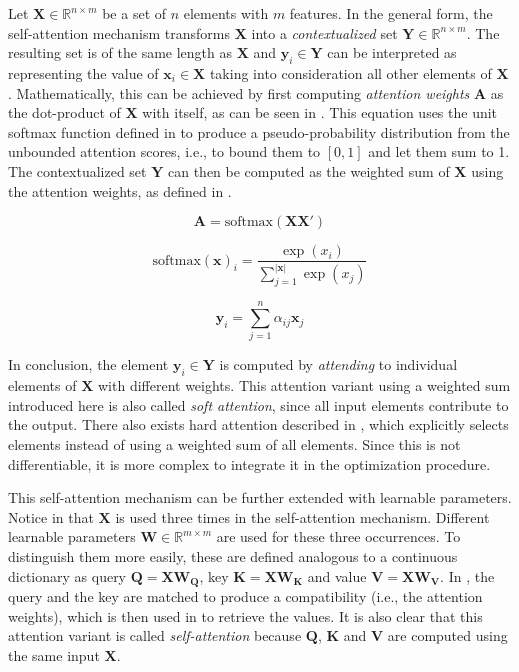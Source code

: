 Let $\mathbf{X} \in \mathbb{R}^{n\times m}$ be a set of $n$ elements with $m$ features. In the general form, the self-attention mechanism transforms $\mathbf{X}$ into a \emph{contextualized} set $\mathbf{Y} \in \mathbb{R}^{n \times m}$. The resulting set is of the same length as $\mathbf{X}$ and $\mathbf{y}_i \in \mathbf{Y}$ can be interpreted as representing the value of $\mathbf{x}_i \in \mathbf{X}$ taking into consideration all other elements of $\mathbf{X}$. Mathematically, this can be achieved by first computing \emph{attention weights} $\mathbf{A}$ as the dot-product of $\mathbf{X}$ with itself, as can be seen in . This equation uses the unit softmax function defined in  to produce a pseudo-probability distribution from the unbounded attention scores, i.e., to bound them to $[0,1]$ and let them sum to 1. The contextualized set $\mathbf{Y}$ can then be computed as the weighted sum of $\mathbf{X}$ using the attention weights, as defined in .

\begin{equation}
        \label{eq:attn}
        \mathbf{A} = \text{softmax}(\mathbf{X}\mathbf{X}')
\end{equation}

\begin{equation}
        \label{eq:softmax}
        \text{softmax}(\mathbf{x})_i=\frac {\exp(x_i)}{\sum_{j=1} ^{|\mathbf{x}|} \exp(x_j)}
\end{equation}

\begin{equation}
        \label{eq:attn.res}
        \mathbf{y}_i = \sum_{j=1}^{n} \alpha_{ij} \mathbf{x}_j
\end{equation}

In conclusion, the element $\mathbf{y}_i \in \mathbf{Y}$ is computed by \emph{attending} to individual elements of $\mathbf{X}$ with different weights. This attention variant using a weighted sum introduced here is also called \emph{soft attention}, since all input elements contribute to the output. There also exists hard attention described in \citet{pmlr-v37-xuc15}, which explicitly selects elements instead of using a weighted sum of all elements. Since this is not differentiable, it is more complex to integrate it in the optimization procedure.

This self-attention mechanism can be further extended with learnable parameters. Notice in  that $\mathbf{X}$ is used three times in the self-attention mechanism. Different learnable parameters $\mathbf{W}\in\mathbb{R}^{m\times m}$ are used for these three occurrences.  To distinguish them more easily, these are defined analogous to a continuous dictionary as query $\mathbf{Q}=\mathbf{X}\mathbf{W_Q}$, key $\mathbf{K}=\mathbf{X}\mathbf{W_K}$ and value $\mathbf{V}=\mathbf{X}\mathbf{W_V}$. In , the query and the key are matched to produce a compatibility (i.e., the attention weights), which is then used in  to retrieve the values. It is also clear that this attention variant is called \emph{self-attention} because $\mathbf{Q}$, $\mathbf{K}$ and $\mathbf{V}$ are computed using the same input $\mathbf{X}$.

